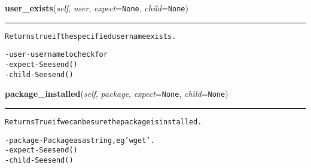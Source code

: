     \label{shutit_global:ShutIt:user_exists}

    \vspace{0.5ex}

\hspace{.8\funcindent}\begin{boxedminipage}{\funcwidth}

    \raggedright \textbf{user\_exists}(\textit{self}, \textit{user}, \textit{expect}={\tt None}, \textit{child}={\tt None})

    \vspace{-1.5ex}

    \rule{\textwidth}{0.5\fboxrule}
\setlength{\parskip}{2ex}
\begin{alltt}
Returns true if the specified username exists.

- user   - username to check for
- expect - See send()
- child  - See send()
\end{alltt}

\setlength{\parskip}{1ex}
    \end{boxedminipage}

    \label{shutit_global:ShutIt:package_installed}

    \vspace{0.5ex}

\hspace{.8\funcindent}\begin{boxedminipage}{\funcwidth}

    \raggedright \textbf{package\_installed}(\textit{self}, \textit{package}, \textit{expect}={\tt None}, \textit{child}={\tt None})

    \vspace{-1.5ex}

    \rule{\textwidth}{0.5\fboxrule}
\setlength{\parskip}{2ex}
\begin{alltt}
Returns True if we can be sure the package is installed.

- package - Package as a string, eg 'wget'.
- expect  - See send()
- child   - See send()
\end{alltt}

\setlength{\parskip}{1ex}
    \end{boxedminipage}

    \label{shutit_global:ShutIt:is_shutit_installed}

